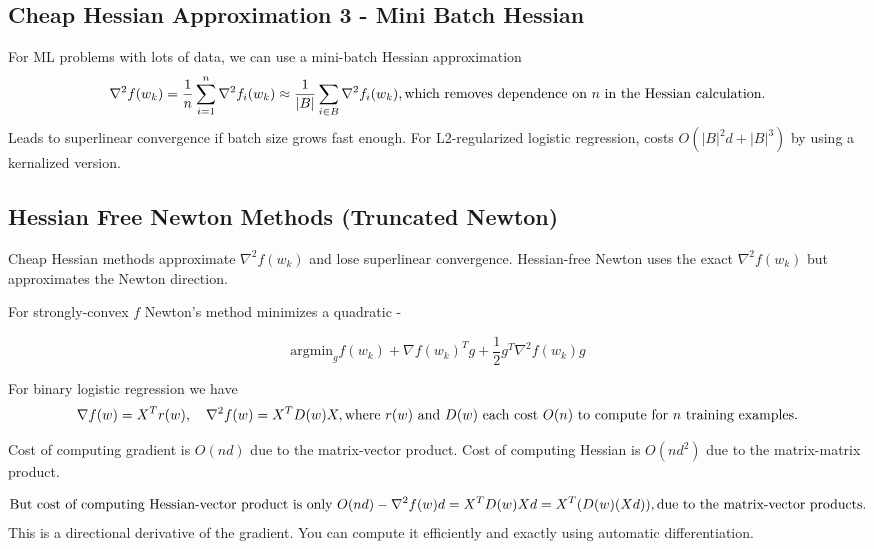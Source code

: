 \documentclass[
]{article}
\begin{document}
\subsection{Cheap Hessian Approximation 3 - Mini Batch Hessian}\label{cheap-hessian-approximation-3---mini-batch-hessian}

For ML problems with lots of data, we can use a mini-batch Hessian approximation
\[
\nabla^2 f(w_k) = \frac{1}{n} \sum_{i=1}^n \nabla^2 f_i(w_k) \approx \frac{1}{|B|} \sum_{i \in B} \nabla^2 f_i(w_k), \\
\text{which removes dependence on } n \text{ in the Hessian calculation.} \\
\]
Leads to superlinear convergence if batch size grows fast enough. For L2-regularized logistic regression, costs \(O(|B|^2d + |B|^3)\) by using a kernalized version.

\subsection{Hessian Free Newton Methods (Truncated Newton)}\label{hessian-free-newton-methods-truncated-newton}

Cheap Hessian methods approximate \(\nabla^2 f(w_k)\) and lose superlinear convergence. Hessian-free Newton uses the exact \(\nabla^2 f(w_k)\) but approximates the Newton direction.

For strongly-convex \(f\) Newton's method minimizes a quadratic -

\[
\text{argmin}_g f(w_k) + \nabla f(w_k)^T g + \frac{1}{2} g^T \nabla^2 f(w_k) g
\]

For binary logistic regression we have
\[
\nabla f(w) = X^T r(w), \quad \nabla^2 f(w) = X^T D(w) X, \\
\text{where } r(w) \text{ and } D(w) \text{ each cost } O(n) \text{ to compute for } n \text{ training examples.} \\
\]

Cost of computing gradient is \(O(nd)\) due to the matrix-vector product. Cost of computing Hessian is \(O(nd^2)\) due to the matrix-matrix product.

\[
\text{But cost of computing Hessian-vector product is only } O(nd) - \\
\nabla^2 f(w) d = X^T D(w) Xd = X^T (D(w) (Xd)), \\
\text{due to the matrix-vector products.}
\]
This is a directional derivative of the gradient. You can compute it efficiently and exactly using automatic differentiation.
\end{document}
